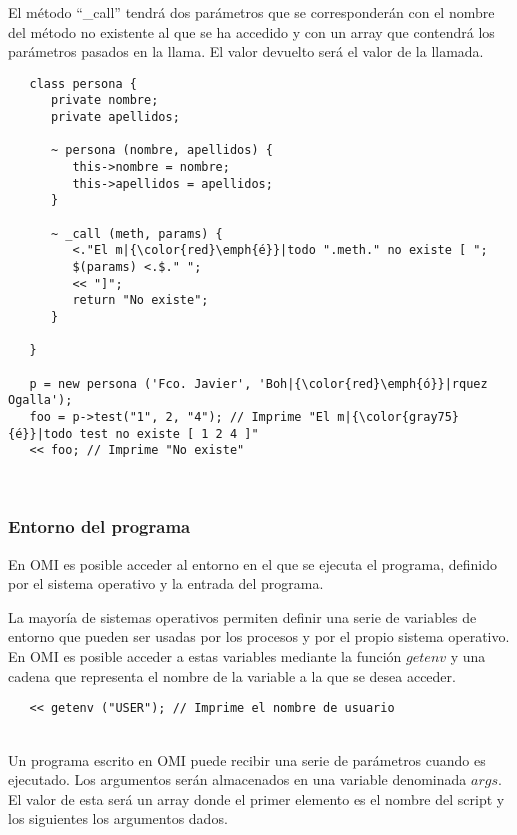 El método ``\_call'' tendrá dos parámetros que se corresponderán con 
el nombre del método no existente al que se ha accedido y 
con un array que contendrá los parámetros pasados en la llama. El valor devuelto
será el valor de la llamada. \\

\begin{lstlisting}
   class persona {
      private nombre;
      private apellidos;
      
      ~ persona (nombre, apellidos) {
         this->nombre = nombre;
         this->apellidos = apellidos;
      }
      
      ~ _call (meth, params) {
         <."El m|{\color{red}\emph{é}}|todo ".meth." no existe [ ";
         $(params) <.$." ";
         << "]";
         return "No existe";
      }
      
   }
   
   p = new persona ('Fco. Javier', 'Boh|{\color{red}\emph{ó}}|rquez Ogalla');
   foo = p->test("1", 2, "4"); // Imprime "El m|{\color{gray75}{é}}|todo test no existe [ 1 2 4 ]"
   << foo; // Imprime "No existe"
\end{lstlisting}
\hfill\\ 

\subsubsection{Entorno del programa} \label{sec:environment}

En OMI es posible  acceder al entorno en el que se ejecuta el programa, definido por el sistema 
operativo y la entrada del programa. 

La mayoría de sistemas operativos permiten definir una serie de variables de entorno que pueden ser usadas
por los procesos y por el propio sistema operativo. En OMI es posible acceder a estas variables
mediante la función $getenv$ y una cadena que representa el nombre de la variable a la que se desea acceder. \\

\begin{lstlisting}
   << getenv ("USER"); // Imprime el nombre de usuario 
\end{lstlisting}
\hfill\\ 

Un programa escrito en OMI puede recibir una serie de parámetros cuando es ejecutado. Los argumentos serán almacenados
en una variable denominada $args$. El valor de esta será un array donde el primer elemento es el nombre del script y los siguientes
los argumentos dados. \\

